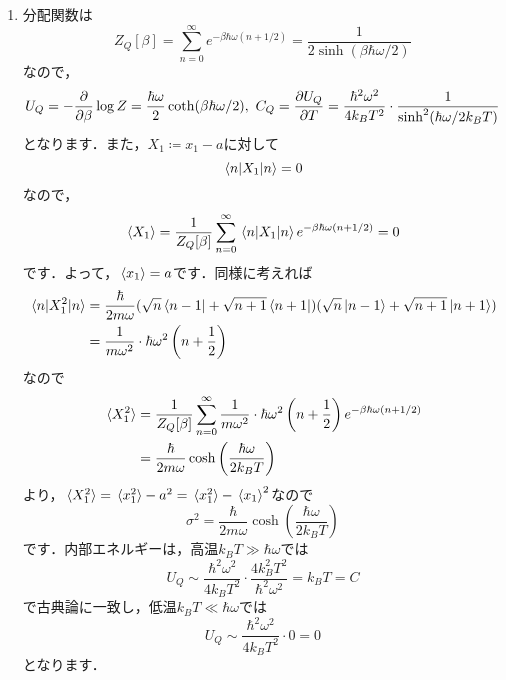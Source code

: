 \documentclass[a4paper,pdflatex,ja=standard]{bxjsarticle}
\begin{document}
\begin{enumerate}
  \item 
  分配関数は
  \begin{equation}
    Z_{Q}[\beta]
    =
    \sum_{n=0}^{\infty}e^{-\beta\hbar\omega(n+1/2)}
    =
    \frac{1}{2\sinh(\beta\hbar\omega/2)}
  \end{equation}
  なので，
  \begin{equation}
    U_Q
    =
    -\pdv{}{\beta}\log Z
    =
    \frac{\hbar\omega}{2}
    \coth(\beta\hbar\omega/2)
    ,\ 
    C_Q
    =
    \pdv{U_Q}{T}
    =
    \frac{\hbar^2\omega^2}{4k_BT^2}
    \cdot
    \frac{1}{\sinh^2(\hbar\omega/2k_BT)}
  \end{equation}
  となります．また，$X_1\coloneqq x_1-a$に対して
  \begin{equation}
    \ev*{n|X_1|n}
    =
    0
  \end{equation}
  なので，
  \begin{equation}
    \ev*{X_1}
    =
    \frac{1}{Z_{Q}[\beta]}
    \sum_{n=0}^{\infty}
    \ev*{n|X_1|n}
    e^{-\beta\hbar\omega(n+1/2)}
    =
    0
  \end{equation}
  です．よって，$\ev*{x_1}=a$です．同様に考えれば
  \begin{align}
    \ev*{n|X_1^2|n}
    &=
    \frac{\hbar}{2m\omega}
    (\sqrt{n}\bra{n-1}+\sqrt{n+1}\bra{n+1})
    (\sqrt{n}\ket{n-1}+\sqrt{n+1}\ket{n+1})
    \nonumber
    \\
    &=
    \frac{1}{m\omega^2}
    \cdot
    \hbar\omega^2
    \left(  
      n+\frac{1}{2}
    \right)
  \end{align}
  なので
  \begin{align}
    \ev*{X_1^2}
    &=
    \frac{1}{Z_Q[\beta]}
    \sum_{n=0}^{\infty}
    \frac{1}{m\omega^2}
    \cdot
    \hbar\omega^2
    \left(  
      n+\frac{1}{2}
    \right)
    e^{-\beta\hbar\omega(n+1/2)}
    \nonumber
    \\
    &=
    \frac{\hbar}{2m\omega}\cosh\left( \frac{\hbar\omega}{2k_BT} \right)
  \end{align}
  より，$\ev*{X_1^2}=\ev*{x_1^2}-a^2=\ev*{x_1^2}-\ev*{x_1}^2$なので
  \begin{equation}
    \sigma^2
    =
    \frac{\hbar}{2m\omega}\cosh\left( \frac{\hbar\omega}{2k_BT} \right)
  \end{equation}
  です．内部エネルギーは，高温$k_BT\gg\hbar\omega$では
  \begin{equation}
    U_Q
    \sim
    \frac{\hbar^2\omega^2}{4k_BT^2}
    \cdot
    \frac{4k_B^2T^2}{\hbar^2\omega^2}
    =
    k_BT
    =
    C
  \end{equation}
  で古典論に一致し，低温$k_BT\ll\hbar\omega$では
  \begin{equation}
    U_Q
    \sim
    \frac{\hbar^2\omega^2}{4k_BT^2}
    \cdot
    0
    =
    0
  \end{equation}
  となります．


\end{enumerate}
\end{document}
